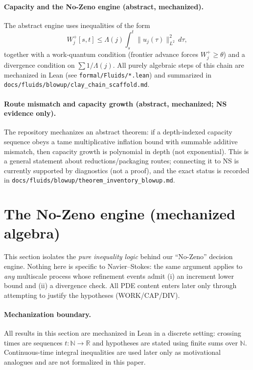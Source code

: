 \documentclass[11pt]{article}
\newcommand{\R}{\mathbb{R}}
\newcommand{\N}{\mathbb{N}}
\begin{document}
\paragraph{Capacity and the No-Zeno engine (abstract, mechanized).}
The abstract engine uses inequalities of the form
\[
W_j^+[s,t]\le \Lambda(j)\int_s^t \|u_j(\tau)\|_{L^2}^2\,d\tau,
\]
together with a work-quantum condition (frontier advance forces $W_j^+\ge \theta$) and a divergence condition on $\sum 1/\Lambda(j)$.
All purely algebraic steps of this chain are mechanized in Lean (see \texttt{formal/Fluids/*.lean}) and summarized in
\texttt{docs/fluids/blowup/clay\_chain\_scaffold.md}.

\paragraph{Route mismatch and capacity growth (abstract, mechanized; NS evidence only).}
The repository mechanizes an abstract theorem: if a depth-indexed capacity sequence obeys a tame multiplicative inflation bound with summable additive mismatch, then capacity growth is polynomial in depth (not exponential). This is a general statement about reductions/packaging routes; connecting it to NS is currently supported by diagnostics (not a proof), and the exact status is recorded in \texttt{docs/fluids/blowup/theorem\_inventory\_blowup.md}.
 \section{The No-Zeno engine (mechanized algebra)}\label{sec:no-zeno-engine}

This section isolates the \emph{pure inequality logic} behind our ``No-Zeno'' decision engine.
Nothing here is specific to Navier--Stokes: the same argument applies to \emph{any} multiscale
process whose refinement events admit (i) an increment lower bound and (ii) a divergence check.
All PDE content enters later only through attempting to justify the hypotheses (WORK/CAP/DIV).

\paragraph{Mechanization boundary.}
All results in this section are mechanized in Lean in a discrete setting:
crossing times are sequences $t:\N\to\R$ and hypotheses are stated using finite sums over $\N$.
Continuous-time integral inequalities are used later only as motivational analogues and are not
formalized in this paper.
\end{document}
